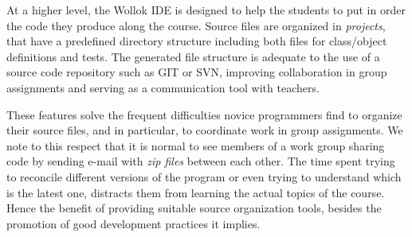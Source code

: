 \medskip
At a higher level, the Wollok IDE is designed to help the students to put in order the code they produce along the course. 
Source files are organized in \emph{projects}, that have a predefined directory structure including both files for class/object definitions and tests.
The generated file structure is adequate to the use of a source code repository such as GIT or SVN, improving collaboration in group assignments and serving as a communication tool with teachers.

These features solve the frequent difficulties novice programmers find to organize their source files, and in particular, to coordinate work in group assignments.
We note to this respect that it is normal to see members of a work group sharing code by sending e-mail with \emph{zip files} between each other.
The time spent trying to reconcile different versions of the program or even trying to understand which is the latest one, distracts them from learning the actual topics of the course.
Hence the benefit of providing suitable source organization tools, besides the promotion of good development practices it implies.

%



